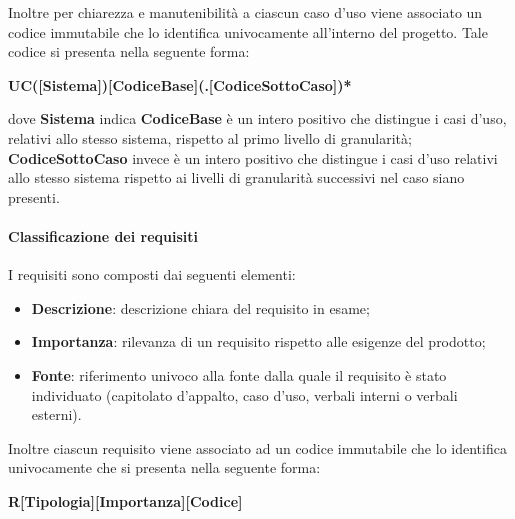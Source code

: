 Inoltre per chiarezza e manutenibilità a ciascun caso d'uso viene associato un codice immutabile che lo identifica univocamente 
all'interno del progetto. Tale codice si presenta nella seguente forma:
\begin{center}
    \textbf{UC([Sistema])[CodiceBase](.[CodiceSottoCaso])*}
\end{center}
dove \textbf{Sistema} indica 
\textbf{CodiceBase} è un intero positivo che distingue i casi d'uso, relativi allo stesso sistema, rispetto al primo livello di 
granularità; \textbf{CodiceSottoCaso} invece è un intero positivo che distingue i casi d'uso relativi allo stesso sistema rispetto ai 
livelli di granularità successivi nel caso siano presenti.

\paragraph{Classificazione dei requisiti}
\label{par:classificazione_requisiti}

I requisiti sono composti dai seguenti elementi:
\begin{itemize}
	\item \textbf{Descrizione}: descrizione chiara del requisito in esame;
	\item \textbf{Importanza}: rilevanza di un requisito rispetto alle esigenze del prodotto;
	\item \textbf{Fonte}: riferimento univoco alla fonte dalla quale il requisito è stato individuato (capitolato d'appalto, caso d'uso, 
		verbali interni o verbali esterni).
\end{itemize}

Inoltre ciascun requisito viene associato ad un codice immutabile che lo identifica univocamente che si presenta nella seguente forma:
\begin{center}
    \textbf{R[Tipologia][Importanza][Codice]}
\end{center}

